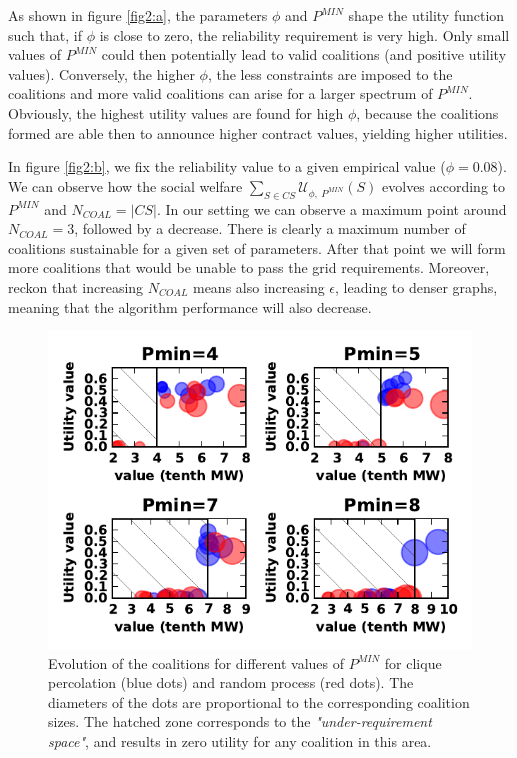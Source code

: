 \documentclass[conference]{IEEEtran}
\begin{document}
As shown in figure \ref{fig2:a}, the parameters $\phi$ and $P^{MIN}$ shape the utility function such that, if $ \phi $ is close to zero, the reliability requirement is very high. Only small values of $ P^{MIN}$ could then potentially lead to valid coalitions (and positive utility values). Conversely, the higher $\phi$, the less constraints are imposed to the coalitions and more valid coalitions can arise for a larger spectrum of $ P^{MIN}$. Obviously, the highest utility values are found for high $ \phi $, because the coalitions formed are able then to announce higher contract values, yielding higher utilities. 

In figure \ref{fig2:b}, we fix the reliability value to a given empirical value ($\phi = 0.08 $). We can observe how the social welfare $\sum_{S \in CS} \mathcal{U}_{\phi,\ P^{MIN}}(S)$ evolves according to $P^{MIN}$ and $ N_{COAL} = |CS| $. In our setting we can observe  a maximum point around $ N_{COAL} = 3 $, followed by a decrease. There is clearly a maximum number of coalitions sustainable for a given set of parameters. After that point we will form more coalitions that would be unable to pass the grid requirements. Moreover, reckon that increasing $ N_{COAL} $ means also increasing $ \epsilon $, leading to denser graphs, meaning that the algorithm performance will also decrease.

\begin{figure}[htbp]
  \centering
  \includegraphics[scale=0.8]{./figure5/coals}
  \caption{Evolution of the coalitions for different values of $ P^{MIN} $ for clique percolation (blue dots) and random process (red dots). The diameters of the dots are proportional to the corresponding coalition sizes. The hatched zone corresponds to the \textit{"under-requirement space"}, and results in zero utility for any coalition in this area.}
  \label{Fig3}
\end{figure}
\end{document}
